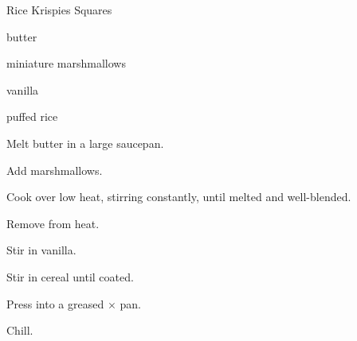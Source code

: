 \begin{recipe}{Rice Krispies Squares}{}{}

\begin{ingredients}
\item \C{\quarter} butter
\item {} miniature marshmallows
\item {} vanilla
\item {} puffed rice 
\end{ingredients}

\begin{directions}
\item Melt butter in a large saucepan.
\item Add marshmallows.
\item Cook over low heat, stirring constantly, until melted and well-blended.
\item Remove from heat.
\item Stir in vanilla.
\item Stir in cereal until coated.
\item Press into a greased $\times$ pan.
\item Chill.
\end{directions}

\end{recipe}
